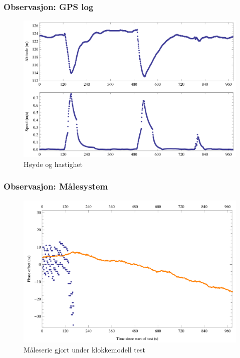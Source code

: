 \documentclass[xcolor=table]{beamer}
\begin{document}
\begin{frame}
\frametitle{Observasjon: GPS log}
        \begin{figure}
        \includegraphics[scale=0.8]{thesis/graphics/20161024-test2-sensor2-multipanel-1-2.png}
        \caption{Høyde og hastighet}
      \end{figure}
\end{frame}

\begin{frame}
\frametitle{Observasjon: Målesystem}
      \begin{figure}
        \includegraphics[scale=0.70]{thesis/graphics/20161024-test2-telemetry-and-cnt91-combined-1-1.png}
        \caption{Måleserie gjort under klokkemodell test}
      \end{figure}
\end{frame}
\end{document}
